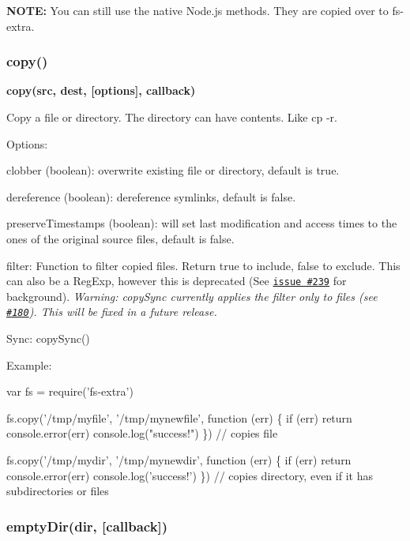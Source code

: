 {\bfseries N\+O\+TE\+:} You can still use the native Node.\+js methods. They are copied over to {\ttfamily fs-\/extra}.

\subsubsection*{copy()}

{\bfseries copy(src, dest, \mbox{[}options\mbox{]}, callback)}

Copy a file or directory. The directory can have contents. Like {\ttfamily cp -\/r}.

Options\+:
\begin{DoxyItemize}
\item clobber (boolean)\+: overwrite existing file or directory, default is {\ttfamily true}.
\item dereference (boolean)\+: dereference symlinks, default is {\ttfamily false}.
\item preserve\+Timestamps (boolean)\+: will set last modification and access times to the ones of the original source files, default is {\ttfamily false}.
\item filter\+: Function to filter copied files. Return {\ttfamily true} to include, {\ttfamily false} to exclude. This can also be a Reg\+Exp, however this is deprecated (See \href{https://github.com/jprichardson/node-fs-extra/issues/239}{\tt issue \#239} for background). {\itshape Warning\+: {\ttfamily copy\+Sync} currently applies the filter only to files (see \href{https://github.com/jprichardson/node-fs-extra/issues/180}{\tt \#180}). This will be fixed in a future release.}
\end{DoxyItemize}

Sync\+: {\ttfamily copy\+Sync()}

Example\+:


\begin{DoxyCode}
var fs = require('fs-extra')

fs.copy('/tmp/myfile', '/tmp/mynewfile', function (err) \{
  if (err) return console.error(err)
  console.log("success!")
\}) // copies file

fs.copy('/tmp/mydir', '/tmp/mynewdir', function (err) \{
  if (err) return console.error(err)
  console.log('success!')
\}) // copies directory, even if it has subdirectories or files
\end{DoxyCode}


\subsubsection*{empty\+Dir(dir, \mbox{[}callback\mbox{]})}

